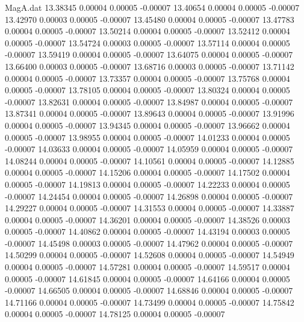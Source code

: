 \begin{filecontents}{MagA.dat}
  13.38345    0.00004    0.00005   -0.00007
  13.40654    0.00004    0.00005   -0.00007
  13.42970    0.00003    0.00005   -0.00007
  13.45480    0.00004    0.00005   -0.00007
  13.47783    0.00004    0.00005   -0.00007
  13.50214    0.00004    0.00005   -0.00007
  13.52412    0.00004    0.00005   -0.00007
  13.54724    0.00003    0.00005   -0.00007
  13.57114    0.00004    0.00005   -0.00007
  13.59419    0.00004    0.00005   -0.00007
  13.64075    0.00004    0.00005   -0.00007
  13.66400    0.00003    0.00005   -0.00007
  13.68716    0.00003    0.00005   -0.00007
  13.71142    0.00004    0.00005   -0.00007
  13.73357    0.00004    0.00005   -0.00007
  13.75768    0.00004    0.00005   -0.00007
  13.78105    0.00004    0.00005   -0.00007
  13.80324    0.00004    0.00005   -0.00007
  13.82631    0.00004    0.00005   -0.00007
  13.84987    0.00004    0.00005   -0.00007
  13.87341    0.00004    0.00005   -0.00007
  13.89643    0.00004    0.00005   -0.00007
  13.91996    0.00004    0.00005   -0.00007
  13.94345    0.00004    0.00005   -0.00007
  13.96662    0.00004    0.00005   -0.00007
  13.98955    0.00004    0.00005   -0.00007
  14.01233    0.00004    0.00005   -0.00007
  14.03633    0.00004    0.00005   -0.00007
  14.05959    0.00004    0.00005   -0.00007
  14.08244    0.00004    0.00005   -0.00007
  14.10561    0.00004    0.00005   -0.00007
  14.12885    0.00004    0.00005   -0.00007
  14.15206    0.00004    0.00005   -0.00007
  14.17502    0.00004    0.00005   -0.00007
  14.19813    0.00004    0.00005   -0.00007
  14.22233    0.00004    0.00005   -0.00007
  14.24454    0.00004    0.00005   -0.00007
  14.26898    0.00004    0.00005   -0.00007
  14.29227    0.00004    0.00005   -0.00007
  14.31553    0.00004    0.00005   -0.00007
  14.33887    0.00004    0.00005   -0.00007
  14.36201    0.00004    0.00005   -0.00007
  14.38526    0.00003    0.00005   -0.00007
  14.40862    0.00004    0.00005   -0.00007
  14.43194    0.00003    0.00005   -0.00007
  14.45498    0.00003    0.00005   -0.00007
  14.47962    0.00004    0.00005   -0.00007
  14.50299    0.00004    0.00005   -0.00007
  14.52608    0.00004    0.00005   -0.00007
  14.54949    0.00004    0.00005   -0.00007
  14.57281    0.00004    0.00005   -0.00007
  14.59517    0.00004    0.00005   -0.00007
  14.61845    0.00004    0.00005   -0.00007
  14.64166    0.00004    0.00005   -0.00007
  14.66505    0.00004    0.00005   -0.00007
  14.68846    0.00004    0.00005   -0.00007
  14.71166    0.00004    0.00005   -0.00007
  14.73499    0.00004    0.00005   -0.00007
  14.75842    0.00004    0.00005   -0.00007
  14.78125    0.00004    0.00005   -0.00007

\end{filecontents}
